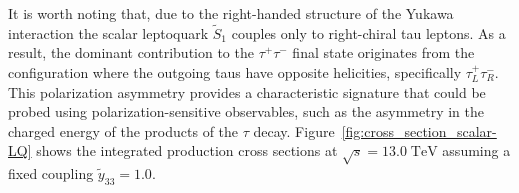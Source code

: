 It is worth noting that, due to the right-handed structure of the Yukawa interaction the scalar leptoquark $\tilde{S}_1$ couples only to right-chiral tau leptons. As a result, the dominant contribution to the $\tau^+\tau^-$ final state originates from the configuration where the outgoing taus have opposite helicities, specifically $\tau^+_L \tau^-_R$. This polarization asymmetry provides a characteristic signature that could be probed using polarization-sensitive observables, such as the asymmetry in the charged energy of the products of the $\tau$ decay. Figure~\ref{fig:cross_section_scalar-LQ} shows the integrated production cross sections at $\sqrt{s} = 13.0\; \si{\tera\electronvolt}$ assuming a fixed coupling $\tilde{y}_{33} = 1.0$.




